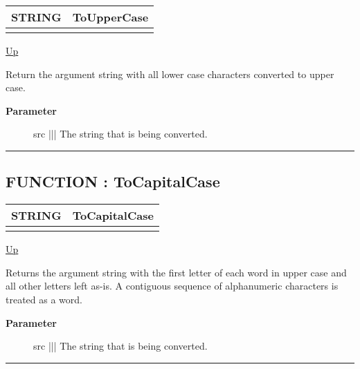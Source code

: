 {\renewcommand{\arraystretch}{1.5}
\begin{tabularx}{\textwidth}{|>{\raggedright\arraybackslash}l|X|}
\hline
\hspace{0pt}STRING & ToUpperCase \\
\hline
\multicolumn{2}{|>{\raggedright\arraybackslash}X|}{\hspace{0pt}(STRING src)} \\
\hline
\end{tabularx}
}

\hyperlink{ecldoc:Str}{Up}

\par
Return the argument string with all lower case characters converted to upper case.

\par
\begin{description}
\item [\textbf{Parameter}] src ||| The string that is being converted.
\end{description}

\rule{\textwidth}{0.4pt}
\subsection*{FUNCTION : ToCapitalCase}
\hypertarget{ecldoc:str.tocapitalcase}{}

{\renewcommand{\arraystretch}{1.5}
\begin{tabularx}{\textwidth}{|>{\raggedright\arraybackslash}l|X|}
\hline
\hspace{0pt}STRING & ToCapitalCase \\
\hline
\multicolumn{2}{|>{\raggedright\arraybackslash}X|}{\hspace{0pt}(STRING src)} \\
\hline
\end{tabularx}
}

\hyperlink{ecldoc:Str}{Up}

\par
Returns the argument string with the first letter of each word in upper case and all other letters left as-is. A contiguous sequence of alphanumeric characters is treated as a word.

\par
\begin{description}
\item [\textbf{Parameter}] src ||| The string that is being converted.
\end{description}

\rule{\textwidth}{0.4pt}
